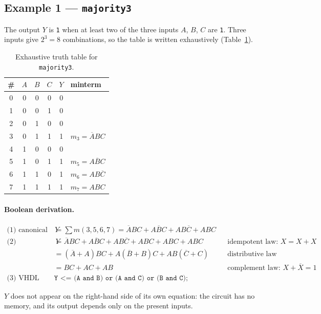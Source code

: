 \subsection{Example 1 --- \texttt{majority3}}

The output $Y$ is \texttt{1} when at least two of the three inputs $A$, $B$, $C$
are \texttt{1}. Three inputs give $2^3 = 8$ combinations, so the table is written
exhaustively (Table~\ref{tab:lab00-maj}).

\begin{table}[H]
\centering
\caption{Exhaustive truth table for \texttt{majority3}.}
\label{tab:lab00-maj}
\begin{tabular}{c|ccc|c|l}
\toprule
\# & $A$ & $B$ & $C$ & $Y$ & minterm \\
\midrule
0 & 0 & 0 & 0 & 0 & \\
1 & 0 & 0 & 1 & 0 & \\
2 & 0 & 1 & 0 & 0 & \\
3 & 0 & 1 & 1 & 1 & $m_3 = \overline{A}BC$ \\
4 & 1 & 0 & 0 & 0 & \\
5 & 1 & 0 & 1 & 1 & $m_5 = A\overline{B}C$ \\
6 & 1 & 1 & 0 & 1 & $m_6 = AB\overline{C}$ \\
7 & 1 & 1 & 1 & 1 & $m_7 = ABC$ \\
\bottomrule
\end{tabular}
\end{table}

\paragraph{Boolean derivation.}
\begin{align*}
\text{(1) canonical} \quad
  Y &= \textstyle\sum m(3,5,6,7) = \overline{A}BC + A\overline{B}C + AB\overline{C} + ABC \\[4pt]
\text{(2) simplified} \quad
  Y &= \overline{A}BC + A\overline{B}C + AB\overline{C} + ABC + ABC + ABC
     && \text{idempotent law: } X = X + X \\
  &= (\overline{A}+A)BC + A(\overline{B}+B)C + AB(\overline{C}+C)
     && \text{distributive law} \\
  &= BC + AC + AB
     && \text{complement law: } X + \overline{X} = 1 \\[4pt]
\text{(3) VHDL} \quad
  & \texttt{Y <= (A and B) or (A and C) or (B and C);}
\end{align*}

$Y$ does not appear on the right-hand side of its own equation: the circuit has no
memory, and its output depends only on the present inputs.

